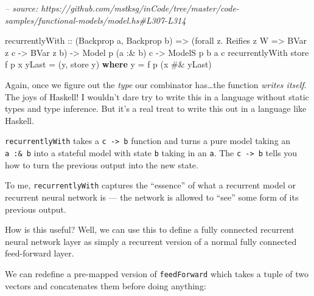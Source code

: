 \documentclass[]{article}
\newenvironment{Shaded}{}{}
\newcommand{\CommentTok}[1]{\textcolor[rgb]{0.38,0.63,0.69}{\textit{#1}}}
\newcommand{\DataTypeTok}[1]{\textcolor[rgb]{0.56,0.13,0.00}{#1}}
\newcommand{\FunctionTok}[1]{\textcolor[rgb]{0.02,0.16,0.49}{#1}}
\newcommand{\KeywordTok}[1]{\textcolor[rgb]{0.00,0.44,0.13}{\textbf{#1}}}
\newcommand{\NormalTok}[1]{#1}
\newcommand{\OtherTok}[1]{\textcolor[rgb]{0.00,0.44,0.13}{#1}}
\begin{document}
\begin{Shaded}
\begin{Highlighting}[]
\CommentTok{-- source: https://github.com/mstksg/inCode/tree/master/code-samples/functional-models/model.hs#L307-L314}

\NormalTok{recurrentlyWith}
\OtherTok{    ::}\NormalTok{ (}\DataTypeTok{Backprop}\NormalTok{ a, }\DataTypeTok{Backprop}\NormalTok{ b)}
    \OtherTok{=>}\NormalTok{ (forall z}\FunctionTok{.} \DataTypeTok{Reifies}\NormalTok{ z }\DataTypeTok{W} \OtherTok{=>} \DataTypeTok{BVar}\NormalTok{ z c }\OtherTok{->} \DataTypeTok{BVar}\NormalTok{ z b)}
    \OtherTok{->} \DataTypeTok{Model}\NormalTok{  p   (a }\FunctionTok{:&}\NormalTok{ b) c}
    \OtherTok{->} \DataTypeTok{ModelS}\NormalTok{ p b  a       c}
\NormalTok{recurrentlyWith store f p x yLast }\FunctionTok{=}\NormalTok{ (y, store y)}
  \KeywordTok{where}
\NormalTok{    y }\FunctionTok{=}\NormalTok{ f p (x }\FunctionTok{#&}\NormalTok{ yLast)}
\end{Highlighting}
\end{Shaded}

Again, once we figure out the \emph{type} our combinator has\ldots{}the function
\emph{writes itself}. The joys of Haskell! I wouldn't dare try to write this in
a language without static types and type inference. But it's a real treat to
write this out in a language like Haskell.

\texttt{recurrentlyWith} takes a \texttt{c\ -\textgreater{}\ b} function and
turns a pure model taking an \texttt{a\ :\&\ b} into a stateful model with state
\texttt{b} taking in an \texttt{a}. The \texttt{c\ -\textgreater{}\ b} tells you
how to turn the previous output into the new state.

To me, \texttt{recurrentlyWith} captures the ``essence'' of what a recurrent
model or recurrent neural network is --- the network is allowed to ``see'' some
form of its previous output.

How is this useful? Well, we can use this to define a fully connected recurrent
neural network layer as simply a recurrent version of a normal fully connected
feed-forward layer.

We can redefine a pre-mapped version of \texttt{feedForward} which takes a tuple
of two vectors and concatenates them before doing anything:
\end{document}
